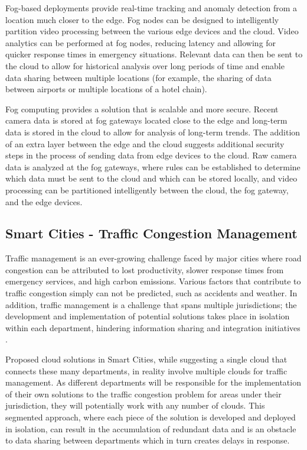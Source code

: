 \documentclass{article}
\begin{document}
Fog-based deployments provide real-time tracking and anomaly detection from a location much closer to the edge. Fog nodes can be designed to intelligently partition video processing between the various edge devices and the cloud. Video analytics can be performed at fog nodes, reducing latency and allowing for quicker response times in emergency situations. Relevant data can then be sent to the cloud to allow for historical analysis over long periods of time and enable data sharing between multiple locations (for example, the sharing of data between airports or multiple locations of a hotel chain).

Fog computing provides a solution that is scalable and more secure. Recent camera data is stored at fog gateways located close to the edge and long-term data is stored in the cloud to allow for analysis of long-term trends. The addition of an extra layer between the edge and the cloud suggests additional security steps in the process of sending data from edge devices to the cloud. Raw camera data is analyzed at the fog gateways, where rules can be established to determine which data must be sent to the cloud and which can be stored locally, and video processing can be partitioned intelligently between the cloud, the fog gateway, and the edge devices.

\subsection{Smart Cities - Traffic Congestion Management}
Traffic management is an ever-growing challenge faced by major cities where road congestion can be attributed to lost productivity, slower response times from emergency services, and high carbon emissions. Various factors that contribute to traffic congestion simply can not be predicted, such as accidents and weather. In addition, traffic management is a challenge that spans multiple jurisdictions; the development and implementation of potential solutions takes place in isolation within each department, hindering information sharing and integration initiatives \cite{openfogconsortium2017trafficmanagement}.

Proposed cloud solutions in Smart Cities, while suggesting a single cloud that connects these many departments, in reality involve multiple clouds for traffic management. As different departments will be responsible for the implementation of their own solutions to the traffic congestion problem for areas under their jurisdiction, they will potentially work with any number of clouds. This segmented approach, where each piece of the solution is developed and deployed in isolation, can result in the accumulation of redundant data and is an obstacle to data sharing between departments which in turn creates delays in response.
\end{document}
